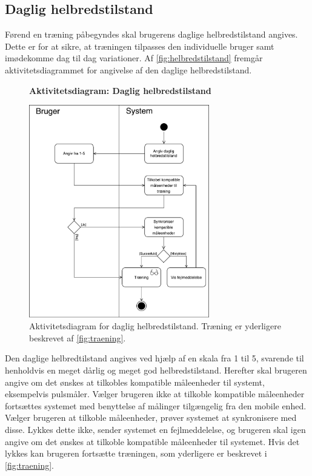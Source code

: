 \subsection*{Daglig helbredstilstand}
Førend en træning påbegyndes skal brugerens daglige helbredstilstand angives. Dette er for at sikre, at træningen tilpasses den individuelle bruger samt imødekomme dag til dag variationer. Af \autoref{fig:helbredstilstand} fremgår aktivitetsdiagrammet for angivelse af den daglige helbredstilstand. 

\begin{figure} [H]
\centering
\textbf{Aktivitetsdiagram: Daglig helbredstilstand}\par\medskip
\includegraphics[width=0.7\textwidth]{figures/aktivitetsdiagram/NYHelbredstilstand}
\caption{Aktivitetsdiagram for daglig helbredstilstand. Træning er yderligere beskrevet af \autoref{fig:traening}.}
\label{fig:helbredstilstand}
\end{figure}

\noindent
Den daglige helbredtilstand angives ved hjælp af en skala fra 1 til 5, svarende til henholdvis en meget dårlig og meget god helbredstilstand. Herefter skal brugeren angive om det ønskes at tilkobles kompatible måleenheder til systemt, eksempelvis pulsmåler. Vælger brugeren ikke at tilkoble kompatible måleenheder fortsættes systemet med benyttelse af målinger tilgængelig fra den mobile enhed. Vælger brugeren at tilkoble måleenheder, prøver systemet at synkronisere med disse. Lykkes dette ikke, sender systemet en fejlmeddelelse, og brugeren skal igen angive om det ønskes at tilkoble kompatible måleenheder til systemet. 
Hvis det lykkes kan brugeren fortsætte træningen, som yderligere er beskrevet i \autoref{fig:traening}. 


